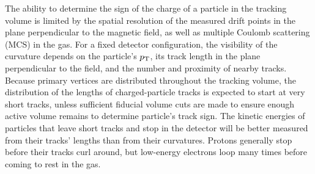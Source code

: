 %
The ability to determine the sign of the charge of a particle in the  tracking volume is limited by the spatial resolution of the measured drift points in the plane perpendicular to the magnetic field, as well as multiple Coulomb scattering (MCS) in the gas. For a fixed detector configuration, the visibility of the curvature depends on the particle's $p_{\rm{T}}$, its track length in the plane perpendicular to the field, and the number and proximity of nearby tracks.  Because primary vertices are distributed throughout the tracking volume, the distribution of the lengths of charged-particle tracks is expected to start at very short tracks, unless sufficient fiducial volume cuts are made to ensure enough active volume remains to determine particle's track sign.  The kinetic energies of particles that leave short tracks and stop in the detector will be better measured from their tracks' lengths than from their curvatures.  Protons generally stop before their tracks curl around, but low-energy electrons loop many times before coming to rest in the gas.

